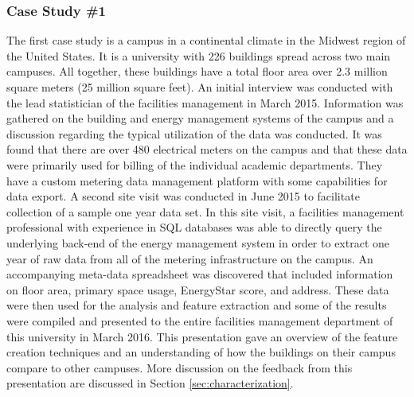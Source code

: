 \subsubsection{Case Study \#1} 
\label{sec:casestudy1}
The first case study is a campus in a continental climate in the Midwest region of the United States. It is a university with 226 buildings spread across two main campuses. All together, these buildings have a total floor area over 2.3 million square meters (25 million square feet). An initial interview was conducted with the lead statistician of the facilities management in March 2015. Information was gathered on the building and energy management systems of the campus and a discussion regarding the typical utilization of the data was conducted. It was found that there are over 480 electrical meters on the campus and that these data were primarily used for billing of the individual academic departments. They have a custom metering data management platform with some capabilities for data export. A second site visit was conducted in June 2015 to facilitate collection of a sample one year data set. In this site visit, a facilities management professional with experience in SQL databases was able to directly query the underlying back-end of the energy management system in order to extract one year of raw data from all of the metering infrastructure on the campus. An accompanying meta-data spreadsheet was discovered that included information on floor area, primary space usage, EnergyStar score, and address. These data were then used for the analysis and feature extraction and some of the results were compiled and presented to the entire facilities management department of this university in March 2016. This presentation gave an overview of the feature creation techniques and an understanding of how the buildings on their campus compare to other campuses. More discussion on the feedback from this presentation are discussed in Section \ref{sec:characterization}.